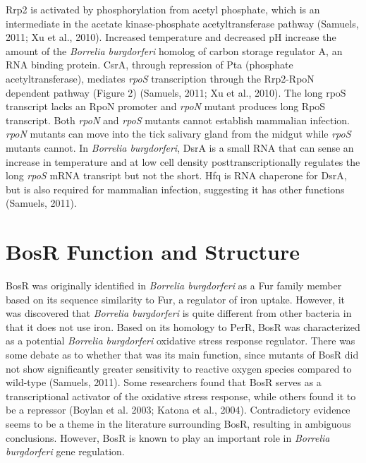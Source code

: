 \documentclass[12pt,twoside]{reedthesis}
\begin{document}
		
		Rrp2 is activated by phosphorylation from acetyl phosphate, which is an intermediate in the acetate kinase-phosphate acetyltransferase pathway (Samuels, 2011; Xu et al., 2010). Increased temperature and decreased pH increase the amount of the \textit{Borrelia burgdorferi} homolog of carbon storage regulator A, an RNA binding protein. CsrA, through repression of Pta (phosphate acetyltransferase), mediates \textit{rpoS} transcription through the Rrp2-RpoN dependent pathway (Figure 2) (Samuels, 2011; Xu et al., 2010). The long rpoS transcript lacks an RpoN promoter and \textit{rpoN} mutant produces long RpoS transcript. Both \textit{rpoN} and \textit{rpoS} mutants cannot establish mammalian infection. \textit{rpoN} mutants can move into the tick salivary gland from the midgut while \textit{rpoS} mutants cannot. In \textit{Borrelia burgdorferi}, DsrA is a small RNA that can sense an increase in temperature and at low cell density posttranscriptionally regulates the long \textit{rpoS} mRNA transript but not the short. Hfq is RNA chaperone for DsrA, but is also required for mammalian infection, suggesting it has other functions (Samuels, 2011). 
		
		\section{BosR Function and Structure}
		
	  BosR was originally identified in \textit{Borrelia burgdorferi} as a Fur family member based on its sequence similarity to Fur, a regulator of iron uptake. However, it was discovered that \textit{Borrelia burgdorferi} is quite different from other bacteria in that it does not use iron. Based on its homology to PerR, BosR was characterized as a potential \textit{Borrelia burgdorferi} oxidative stress response regulator. There was some debate as to whether that was its main function, since mutants of BosR did not show significantly greater sensitivity to reactive oxygen species compared to wild-type (Samuels, 2011). Some researchers found that BosR serves as a transcriptional activator of the oxidative stress response, while others found it to be a repressor (Boylan et al. 2003;  Katona et al., 2004). Contradictory evidence seems to be a theme in the literature surrounding BosR, resulting in ambiguous conclusions. However, BosR is known to play an important role in \textit{Borrelia burgdorferi} gene regulation. 
		
\end{document}
